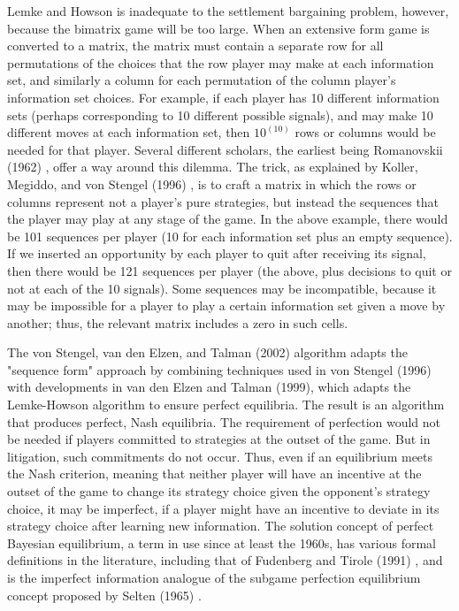 \documentclass{article}
\begin{document}
Lemke and Howson is inadequate to the settlement bargaining problem, however, because the bimatrix game will be too large. When an extensive form game is converted to a matrix, the matrix must contain a separate row for all permutations of the choices that the row player may make at each information set, and similarly a column for each permutation of the column player's information set choices. For example, if each player has 10 different information sets (perhaps corresponding to 10 different possible signals), and may make 10 different moves at each information set, then $10^(10)$ rows or columns would be needed for that player. Several different scholars, the earliest being Romanovskii (1962) \cite{romanovskii}, offer a way around this dilemma. The trick, as explained by Koller, Megiddo, and von Stengel (1996) \cite{kollermegiddovonstengel}, is to craft a matrix in which the rows or columns represent not a player's pure strategies, but instead the sequences that the player may play at any stage of the game. In the above example, there would be 101 sequences per player (10 for each information set plus an empty sequence). If we inserted an opportunity by each player to quit after receiving its signal, then there would be 121 sequences per player (the above, plus decisions to quit or not at each of the 10 signals). Some sequences may be incompatible, because it may be impossible for a player to play a certain information set given a move by another; thus, the relevant matrix includes a zero in such cells. 

The von Stengel, van den Elzen, and Talman (2002) algorithm adapts the "sequence form" approach by combining techniques used in von Stengel (1996) with developments in van den Elzen and Talman (1999), which adapts the Lemke-Howson algorithm to ensure perfect equilibria. The result is an algorithm that produces perfect, Nash equilibria. The requirement of perfection would not be needed if players committed to strategies at the outset of the game. But in litigation, such commitments do not occur. Thus, even if an equilibrium meets the Nash criterion, meaning that neither player will have an incentive at the outset of the game to change its strategy choice given the opponent's strategy choice, it may be imperfect, if a player might have an incentive to deviate in its strategy choice after learning new information. The solution concept of perfect Bayesian equilibrium, a term in use since at least the 1960s, has various formal definitions in the literature, including that of Fudenberg and Tirole (1991) \cite{fudenberg}, and is the imperfect information analogue of the subgame perfection equilibrium concept proposed by Selten (1965) \cite{selten}.
\end{document}
